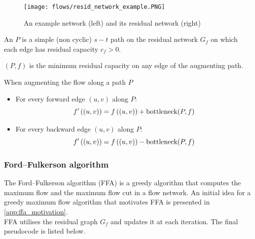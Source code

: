 \documentclass[a4paper]{article}
\begin{document}
\begin{figure}[H]
	\centering %
	\label{fig:resid_network_example}
	\texttt{[image: flows/resid\_network\_example.PNG]}
        \caption{An example network (left) and its residual network (right)}
\end{figure}



\begin{definition}
An  $P$ is a simple (non cyclic) $s-t$ path on the residual network $G_f$ on which each edge has residual capacity $c_f>0$.
\end{definition}
\begin{definition}
$(P,f)$ is the minimum residual capacity on any edge of the augmenting path.
\end{definition}
\begin{corollary}
When augmenting the flow along a path $P$
\begin{itemize}
    \item For every forward edge $(u,v)$ along $P$:
    \begin{equation*}
        f'\left((u,v)\right) = f\left((u,v)\right) + \textup{bottleneck}(P,f)
    \end{equation*}
    \item For every backward edge $(u,v)$ along $P$:
    \begin{equation*}
        f'\left((u,v)\right) = f\left((u,v)\right) - \textup{bottleneck}(P,f)
    \end{equation*}
\end{itemize}
\end{corollary}



\subsubsection{Ford–Fulkerson algorithm}
The Ford–Fulkerson algorithm (FFA) is a greedy algorithm that computes the maximum flow and the maximum flow cut in a flow network. An initial idea for a greedy maximum flow algorithm that motivates FFA is presented in \ref{app:ffa_motivation}.\\
FFA utilises the residual graph $G_f$ and updates it at each iteration. The final pseudocode is listed below.


\end{document}
